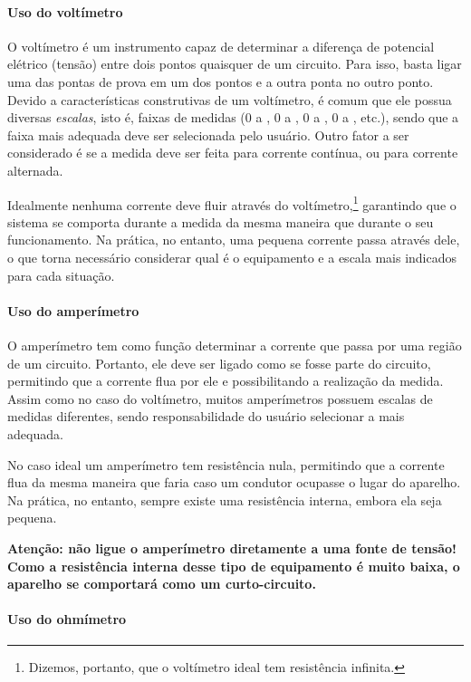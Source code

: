 \paragraph{Uso do voltímetro}

O voltímetro é um instrumento capaz de determinar a diferença de potencial elétrico (tensão) entre dois pontos quaisquer de um circuito. Para isso, basta ligar uma das pontas de prova em um dos pontos e a outra ponta no outro ponto. Devido a características construtivas de um voltímetro, é comum que ele possua diversas \emph{escalas}, isto é, faixas de medidas (0 a , 0 a , 0 a , 0 a , etc.), sendo que a faixa mais adequada deve ser selecionada pelo usuário. Outro fator a ser considerado é se a medida deve ser feita para corrente contínua, ou para corrente alternada.

Idealmente nenhuma corrente deve fluir através do voltímetro,\footnote{Dizemos, portanto, que o voltímetro ideal tem resistência infinita.} garantindo que o sistema se comporta durante a medida da mesma maneira que durante o seu funcionamento. Na prática, no entanto, uma pequena corrente passa através dele, o que torna necessário considerar qual é o equipamento e a escala mais indicados para cada situação.

\paragraph{Uso do amperímetro}

O amperímetro tem como função determinar a corrente que passa por uma região de um circuito. Portanto, ele deve ser ligado como se fosse parte do circuito, permitindo que a corrente flua por ele e possibilitando a realização da medida. Assim como no caso do voltímetro, muitos amperímetros possuem escalas de medidas diferentes, sendo responsabilidade do usuário selecionar a mais adequada.

No caso ideal um amperímetro tem resistência nula, permitindo que a corrente flua da mesma maneira que faria caso um condutor ocupasse o lugar do aparelho. Na prática, no entanto, sempre existe uma resistência interna, embora ela seja pequena.

\textbf{Atenção: não ligue o amperímetro diretamente a uma fonte de tensão! Como a resistência interna desse tipo de equipamento é muito baixa, o aparelho se comportará como um curto-circuito.}

\paragraph{Uso do ohmímetro}

